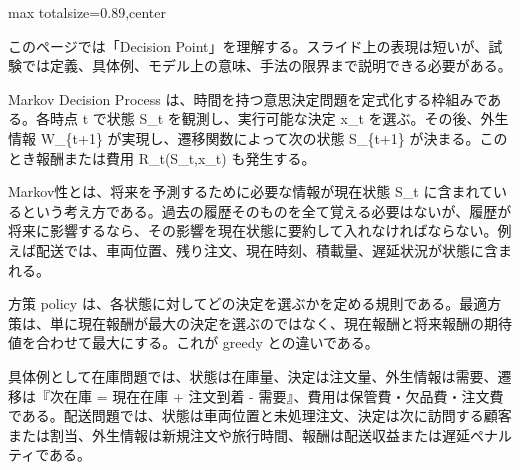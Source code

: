 \begin{minipage}[t]{0.58\textwidth}
\begin{adjustbox}{max totalsize={\textwidth}{0.89\textheight},center}
\begin{minipage}{\textwidth}\scriptsize
{}このページでは「Decision Point」を理解する。スライド上の表現は短いが、試験では定義、具体例、モデル上の意味、手法の限界まで説明できる必要がある。\par
Markov Decision Process は、時間を持つ意思決定問題を定式化する枠組みである。各時点 t で状態 S\_t を観測し、実行可能な決定 x\_t を選ぶ。その後、外生情報 W\_\{t+1\} が実現し、遷移関数によって次の状態 S\_\{t+1\} が決まる。このとき報酬または費用 R\_t(S\_t,x\_t) も発生する。\par
Markov性とは、将来を予測するために必要な情報が現在状態 S\_t に含まれているという考え方である。過去の履歴そのものを全て覚える必要はないが、履歴が将来に影響するなら、その影響を現在状態に要約して入れなければならない。例えば配送では、車両位置、残り注文、現在時刻、積載量、遅延状況が状態に含まれる。\par
方策 policy は、各状態に対してどの決定を選ぶかを定める規則である。最適方策は、単に現在報酬が最大の決定を選ぶのではなく、現在報酬と将来報酬の期待値を合わせて最大にする。これが greedy との違いである。\par
具体例として在庫問題では、状態は在庫量、決定は注文量、外生情報は需要、遷移は『次在庫 = 現在在庫 + 注文到着 - 需要』、費用は保管費・欠品費・注文費である。配送問題では、状態は車両位置と未処理注文、決定は次に訪問する顧客または割当、外生情報は新規注文や旅行時間、報酬は配送収益または遅延ペナルティである。\par

\end{minipage}
\end{adjustbox}
\end{minipage}
